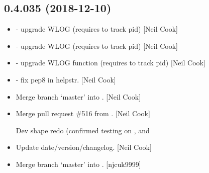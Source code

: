 \documentclass[a4paper,10pt,english]{report}
\begin{document}
\subsection{0.4.035 (2018-12-10)}
\label{\detokenize{misc/changelog:id241}}\begin{itemize}
\item {} 
 - upgrade WLOG (requires  to track pid)
{[}Neil Cook{]}

\item {} 
 - upgrade WLOG (requires  to track pid)
{[}Neil Cook{]}

\item {} 
 - upgrade WLOG function (requires  to track
pid) {[}Neil Cook{]}

\item {} 
 - fix pep8 in helpstr. {[}Neil Cook{]}

\item {} 
Merge branch ‘master’ into . {[}Neil Cook{]}

\item {} 
Merge pull request \#516 from . {[}Neil Cook{]}

Dev shape redo (confirmed testing on ,  and 

\item {} 
Update date/version/changelog. {[}Neil Cook{]}

\item {} 
Merge branch ‘master’ into . {[}njcuk9999{]}

\end{itemize}
\end{document}

